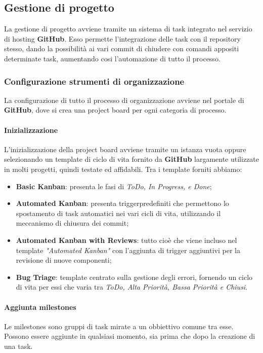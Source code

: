 \subsection{Gestione di progetto}
La gestione di progetto avviene tramite un sistema di task integrato nel servizio di hosting \textbf{GitHub}. 
Esso permette l'integrazione delle task con il repository stesso, dando la possibilità ai vari commit di chiudere con comandi appositi determinate task, 
aumentando cosi l'automazione di tutto il processo. 

\subsubsection{Configurazione strumenti di organizzazione}
	La configurazione di tutto il processo di organizzazione avviene nel portale di \textbf{GitHub}, dove si crea una project board per ogni categoria di processo. 	

	\paragraph{Inizializzazione}
	L'inizializzazione della project board avviene tramite un istanza vuota oppure selezionando un template di ciclo di vita fornito da \textbf{GitHub} 
	largamente utilizzate in molti progetti, quindi testate ed affidabili. Tra i template forniti abbiamo: 

	\begin{itemize}
		\item \textbf{Basic Kanban}: presenta le fasi di \textit{ToDo, In Progress, e Done}; 
		\item \textbf{Automated Kanban}: presenta trigger\glossario predefiniti che permettono lo spostamento di task automatici nei vari cicli di vita, utilizzando il meccanismo di chiusura 
		dei commit;
		\item \textbf{Automated Kanban with Reviews}: tutto cioè che viene incluso nel template \textit{"Automated Kanban"} con l'aggiunta di trigger 
		aggiuntivi per la revisione di nuove componenti; 
		\item \textbf{Bug Triage}: template centrato sulla gestione degli errori, fornendo un ciclo di vita per essi che varia tra \textit{ToDo, Alta Priorità, Bassa Priorità e Chiusi}. 
	\end{itemize}
	  	
	\paragraph{Aggiunta milestones}
	Le milestones sono gruppi di task mirate a un obbiettivo comune tra esse.
	Possono essere aggiunte in qualsiasi momento, sia prima che dopo la creazione di una task.

